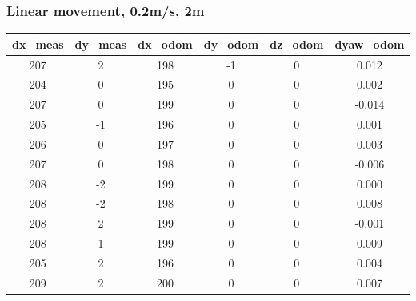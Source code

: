 \documentclass[a4paper, 12pt]{article}
\begin{document}
    \subsubsection{Linear movement, 0.2m/s, 2m}
    \begin{table}[H]
    \scriptsize
    \begin{tabular}{@{}cccccc@{}}
    \toprule
    \textbf{dx\_meas} & \textbf{dy\_meas} & \textbf{dx\_odom} & \textbf{dy\_odom} & \textbf{dz\_odom} & \textbf{dyaw\_odom} \\ \midrule
    207                   & 2                     & 198               & -1                & 0                 & 0.012               \\
    204                   & 0                     & 195               & 0                 & 0                 & 0.002               \\
    207                   & 0                     & 199               & 0                 & 0                 & -0.014              \\
    205                   & -1                    & 196               & 0                 & 0                 & 0.001               \\
    206                   & 0                     & 197               & 0                 & 0                 & 0.003               \\
    207                   & 0                     & 198               & 0                 & 0                 & -0.006              \\
    208                   & -2                    & 199               & 0                 & 0                 & 0.000               \\
    208                   & -2                    & 198               & 0                 & 0                 & 0.008               \\
    208                   & 2                     & 199               & 0                 & 0                 & -0.001              \\
    208                   & 1                     & 199               & 0                 & 0                 & 0.009               \\
    205                   & 2                     & 196               & 0                 & 0                 & 0.004               \\
    209                   & 2                     & 200               & 0                 & 0                 & 0.007               \\

\end{tabular}
\end{table}
\end{document}
